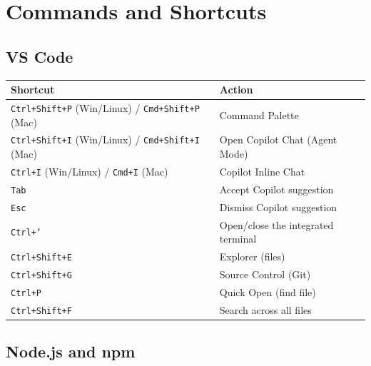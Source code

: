 \chapter{Commands and Shortcuts}
\label{app:commands}

\section{VS Code}

\begin{center}
\begin{tabularx}{\textwidth}{l X}
\toprule
\textbf{Shortcut} & \textbf{Action} \\
\midrule
\texttt{Ctrl+Shift+P} (Win/Linux) / \texttt{Cmd+Shift+P} (Mac) & Command Palette \\
\texttt{Ctrl+Shift+I} (Win/Linux) / \texttt{Cmd+Shift+I} (Mac) & Open Copilot Chat (Agent Mode) \\
\texttt{Ctrl+I} (Win/Linux) / \texttt{Cmd+I} (Mac) & Copilot Inline Chat \\
\texttt{Tab} & Accept Copilot suggestion \\
\texttt{Esc} & Dismiss Copilot suggestion \\
\texttt{Ctrl+`} & Open/close the integrated terminal \\
\texttt{Ctrl+Shift+E} & Explorer (files) \\
\texttt{Ctrl+Shift+G} & Source Control (Git) \\
\texttt{Ctrl+P} & Quick Open (find file) \\
\texttt{Ctrl+Shift+F} & Search across all files \\
\bottomrule
\end{tabularx}
\end{center}

\section{Node.js and npm}

